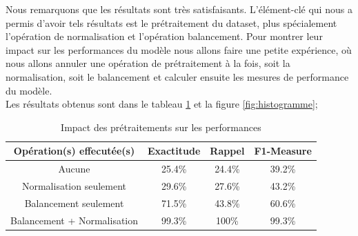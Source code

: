 Nous remarquons que les résultats sont très satisfaisants. L'élément-clé qui nous a permis d'avoir tels résultats est le prétraitement du dataset, plus spécialement l'opération de normalisation et l'opération balancement. Pour montrer leur impact sur les performances du modèle nous allons faire une petite expérience, où nous allons annuler une opération de prétraitement à la fois, soit la normalisation, soit le balancement et calculer ensuite les mesures de performance du modèle.\\

\noindent Les résultats obtenus sont dans le tableau \ref{table:compare} et la figure \ref{fig:histogramme};
\begin{table}[t]
	\begin{center}
		\begin{tabular}{  | c | c | c | c | }
			\hline
			 Opération(s) effecutée(s) & Exactitude & Rappel & F1-Measure \\
			\hline
			\hline
			Aucune & 25.4\% & 24.4\% & 39.2\% \\
			\hline
			Normalisation seulement & 29.6\% & 27.6\% & 43.2\% \\
			\hline
			Balancement seulement & 71.5\% & 43.8\% & 60.6\% \\
			\hline
			\rowcolor[rgb]{0.9,0.70,0.70}
			Balancement + Normalisation & 99.3\% & 100\% & 99.3\% \\
			\hline
		\end{tabular}
		\caption{Impact des prétraitements sur les performances}
		\label{table:compare}
	\end{center}	
\end{table}


